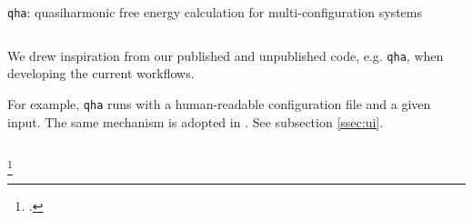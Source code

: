\begin{frame}{\texttt{qha}: quasiharmonic free energy calculation for multi-configuration systems}
    \begin{columns}[t]
        \begin{column}[T, onlytextwidth]{0.4\textwidth} %
            We drew inspiration from our published and unpublished code, e.g.
            \texttt{qha}\footnotemark, when developing the current workflows.

            For example, \texttt{qha} runs with a human-readable
            configuration file and a given input.
            The same mechanism is adopted in \express{}.
            See subsection \ref{ssec:ui}.
        \end{column}

        \begin{column}[T]{0.6\textwidth}
        \end{column}
    \end{columns}
    \footcitetext{QIN2019199}

\end{frame}
